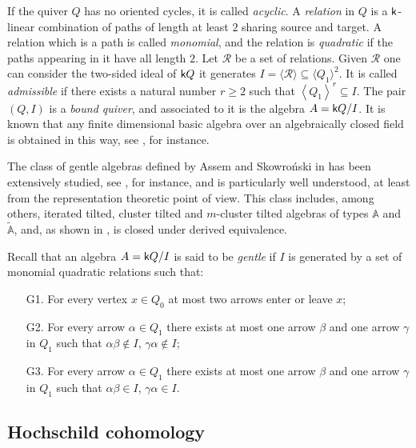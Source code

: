 \documentclass{amsart}
\theoremstyle{plain}
\theoremstyle{definition}
\begin{document}
If the quiver $Q$ has no oriented cycles, it is called \emph{acyclic}. A \emph{relation} in $Q$ is a ${{\normalfont{\textsf{k}}}}$-linear combination of paths of length at least $2$ sharing source and target.  A relation which is a path is called \emph{monomial}, and the relation is \emph{quadratic} if the paths appearing in it have all length $2$. Let $\mathcal{R}$ be a set of relations.
 Given $\mathcal{R}$ one can consider the two-sided ideal of ${{\normalfont{\textsf{k}}}} Q$ it generates $I=\langle \mathcal{R}\rangle \subseteq  \langle Q_1 \rangle^2$. It is called \emph{admissible} if there exists a natural number $r\geqslant 2$ such that $\left\langle Q_1 \right\rangle^r \subseteq I$. The pair $(Q,I)$ is a \emph{bound quiver}, and associated to it is the algebra $A={{\normalfont{\textsf{k}}}} Q/I$.
It is known that any finite dimensional basic algebra over an algebraically closed field is obtained in this way, see \cite{ASS06}, for instance.

The class of gentle algebras  defined by Assem and Skowro\'nski in \cite{AH81}  has been extensively studied, see \cite{AS87, AG08, BB10, Buan2008, Murphy2010, SZ03}, for instance, and is particularly well understood, at least from the representation theoretic point of view. This class includes, among others, iterated tilted,  cluster tilted and $m$-cluster tilted algebras of types $\mathbb{A}$ and $\tilde{\mathbb{A}}$, and, as shown in \cite{SZ03}, is closed under derived equivalence.

Recall  that an algebra  $A= {{\normalfont{\textsf{k}}}} Q/I$ is said to be \emph{gentle} if  $I$ is generated by a set of monomial quadratic relations such that:
 

\begin{enumerate}
 \item[G1.] For every vertex $x\in Q_0$  at most two arrows enter or leave $x$;
 \item[G2.] For every arrow $\alpha\in Q_1$ there exists at most one arrow $\beta$ and one arrow $\gamma$ in $ Q_1$ such that $\alpha\beta\not\in I$, $\gamma\alpha\not\in I $;
 \item[G3.] For every arrow $\alpha\in Q_1$ there exists at most one arrow $\beta$ and one arrow $\gamma$ in $Q_1$ such that $\alpha\beta\in I$, $\gamma\alpha\in I$.
\end{enumerate}

\subsection{Hochschild cohomology}
\end{document}
